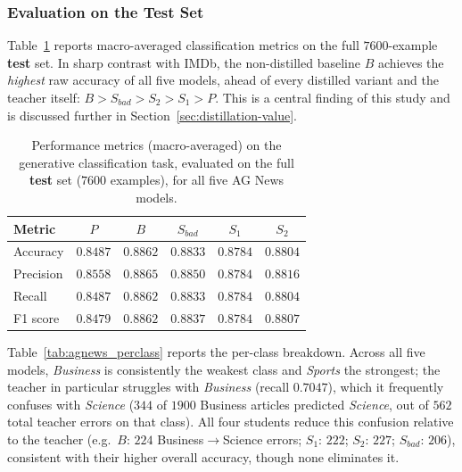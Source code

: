 \documentclass[conference]{IEEEtran}
\begin{document}
\subsubsection{Evaluation on the \textbf{Test} Set}\label{sec:agnews-test-eval}

Table~\ref{tab:agnews_perf} reports macro-averaged classification metrics on the full $7600$-example \textbf{test} set. In sharp contrast with IMDb, the non-distilled baseline $B$ achieves the \emph{highest} raw accuracy of all five models, ahead of every distilled variant and the teacher itself: $B > S_{bad} > S_2 > S_1 > P$. This is a central finding of this study and is discussed further in Section~\ref{sec:distillation-value}.

\begin{table}[h!]
\centering
\caption{Performance metrics (macro-averaged) on the generative classification task, evaluated on the full \textbf{test} set ($7600$ examples), for all five AG News models.}
    \begin{tabular}{|l|c|c|c|c|c|}
        \hline
        Metric & $P$ & $B$ & $S_{bad}$ & $S_1$ & $S_2$ \\ \hline
        Accuracy & $0.8487$ & $0.8862$ & $0.8833$ & $0.8784$ & $0.8804$ \\
        Precision & $0.8558$ & $0.8865$ & $0.8850$ & $0.8784$ & $0.8816$ \\
        Recall & $0.8487$ & $0.8862$ & $0.8833$ & $0.8784$ & $0.8804$ \\
        F1 score & $0.8479$ & $0.8862$ & $0.8837$ & $0.8784$ & $0.8807$ \\ \hline
    \end{tabular}
    \label{tab:agnews_perf}
\end{table}

Table~\ref{tab:agnews_perclass} reports the per-class breakdown. Across all five models, \textit{Business} is consistently the weakest class and \textit{Sports} the strongest; the teacher in particular struggles with \textit{Business} (recall $0.7047$), which it frequently confuses with \textit{Science} ($344$ of $1900$ Business articles predicted \textit{Science}, out of $562$ total teacher errors on that class). All four students reduce this confusion relative to the teacher (e.g.\ $B$: $224$ Business$\to$Science errors; $S_1$: $222$; $S_2$: $227$; $S_{bad}$: $206$), consistent with their higher overall accuracy, though none eliminates it.
\end{document}
